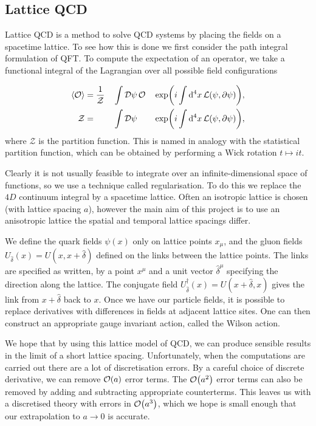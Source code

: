 \documentclass[a4paper,12pt]{article}
\begin{document}
\subsection{Lattice QCD}\label{section:lattice}
Lattice QCD is a method to solve QCD systems by placing the fields on a spacetime lattice. To see how this is done we first consider the path integral formulation of QFT\@. To compute the expectation of an operator, we take a functional integral of the Lagrangian over all possible field configurations\cite{1948Feynman, 2015Colquhoun}

\begin{alignat}{3}
    \label{eq:PathIntegral}
    \expval{\mathcal{O}} &= \dfrac{1}{\mathcal{Z}}&&\int\mathinner{\operatorname{\mathrm{\mathcal{D}}}\!\psi} \mathcal{O}  &&\exp(i \int \dd[4]{x} \mathcal{L}(\psi, \partial \psi)), \\
    \mathcal{Z}          &=                       &&\int\mathinner{\operatorname{\mathrm{\mathcal{D}}}\!\psi}              &&\exp(i \int \dd[4]{x} \mathcal{L}(\psi, \partial \psi)),
\end{alignat}
where $\mathcal{Z}$ is the partition function. This is named in analogy with the statistical partition function, which can be obtained by performing a Wick rotation $t \mapsto it$.

Clearly it is not usually feasible to integrate over an infinite-dimensional space of functions, so we use a technique called regularisation. To do this we replace the $4D$ continuum integral by a spacetime lattice. Often an isotropic lattice is chosen (with lattice spacing $a$), however the main aim of this project is to use an anisotropic lattice the spatial and temporal lattice spacings differ.

We define the quark fields\cite{2015Colquhoun} $\psi(x)$ only on lattice points $x_\mu$, and the gluon fields $U_{\hat{\delta}}(x) = U(x, x + \hat{\delta})$ defined on the links between the lattice points. The links are specified as written, by a point $x^\mu$ and a unit vector $\hat{\delta}^\mu$ specifying the direction along the lattice. The conjugate field $U^\dagger_{\hat{\delta}}(x) = U(x + \hat{\delta}, x)$ gives the link from $x+\hat{\delta}$ back to $x$. Once we have our particle fields, it is possible to replace derivatives with differences in fields at adjacent lattice sites. One can then construct an appropriate gauge invariant action, called the Wilson action.

We hope that by using this lattice model of QCD, we can produce sensible results in the limit of a short lattice spacing. Unfortunately, when the computations are carried out there are a lot of discretisation errors\cite{2009LatticeDiscretization}. By a careful choice of discrete derivative, we can remove $\order{a}$ error terms. The $\order{a^2}$ error terms can also be removed by adding and subtracting appropriate counterterms\cite{1983ImproveLatticeAction}. This leaves us with a discretised theory with errors in $\order{a^3}$, which we hope is small enough that our extrapolation to $a \rightarrow 0$ is accurate.
\end{document}
